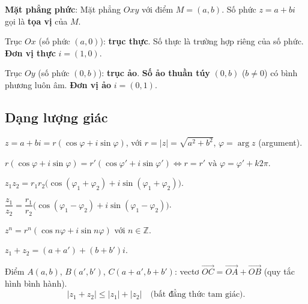 \documentclass[12pt,a4paper]{article}
\begin{document}
\begin{dinhnghia}
  \textbf{Mặt phẳng phức}: Mặt phẳng $Oxy$ với điểm $M = (a, b)$. Số phức $z = a + bi$ gọi là \textbf{tọa vị} của $M$. 
  
  Trục $Ox$ (số phức $(a, 0)$): \textbf{trục thực}. Số thực là trường hợp riêng của số phức. \textbf{Đơn vị thực} $i = (1, 0)$.
  
  Trục $Oy$ (số phức $(0, b)$): \textbf{trục ảo}. \textbf{Số ảo thuần túy} $(0, b)$ ($b \ne 0$) có bình phương luôn âm. \textbf{Đơn vị ảo} $i = (0, 1)$.
\end{dinhnghia}

\subsection{Dạng lượng giác}

\begin{dinhnghia}
  $z = a + bi = r(\cos\varphi + i\sin\varphi)$, với $r = |z| = \sqrt{a^2 + b^2}$, $\varphi = \arg z$ (argument).
\end{dinhnghia}

\begin{tinhchat}
  $r(\cos\varphi + i\sin\varphi) = r'(\cos\varphi' + i\sin\varphi') \Leftrightarrow r = r' \text{ và } \varphi = \varphi' + k2\pi$.
\end{tinhchat}

\begin{congthuc}[title={Nhân và chia}]
  $z_1 z_2 = r_1 r_2\bigl(\cos(\varphi_1 + \varphi_2) + i\sin(\varphi_1 + \varphi_2)\bigr)$.
  
  $\dfrac{z_1}{z_2} = \dfrac{r_1}{r_2}\bigl(\cos(\varphi_1 - \varphi_2) + i\sin(\varphi_1 - \varphi_2)\bigr)$.
\end{congthuc}

\begin{congthuc}[title={Công thức Moivre}]
  $z^n = r^n(\cos n\varphi + i\sin n\varphi)$ với $n \in \mathbb{Z}$.
\end{congthuc}

\begin{congthuc}[title={Tổng và bất đẳng thức tam giác}]
  $z_1 + z_2 = (a + a') + (b + b')i$. 
  
  Điểm $A(a, b)$, $B(a', b')$, $C(a + a', b + b')$: vectơ $\overrightarrow{OC} = \overrightarrow{OA} + \overrightarrow{OB}$ (quy tắc hình bình hành).
  \[
    |z_1 + z_2| \le |z_1| + |z_2| \quad \text{(bất đẳng thức tam giác)}.
  \]
\end{congthuc}
\end{document}
